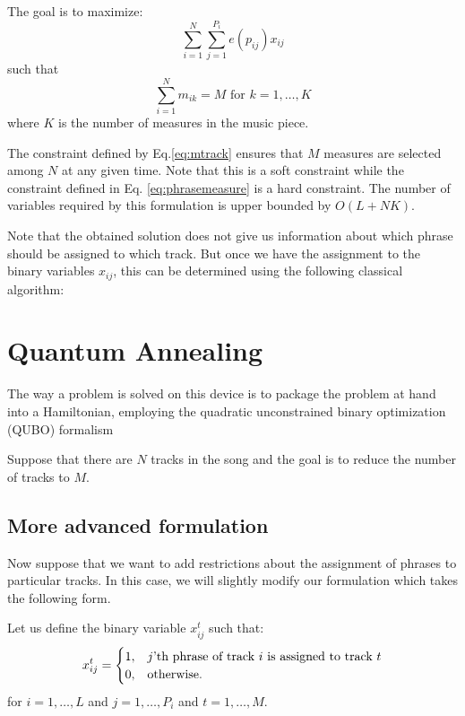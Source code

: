 \documentclass[11pt,a4paper]{article}
\begin{document}
The goal is to maximize:
\begin{equation}
\sum_{i=1}^N\sum_{j=1}^{P_i} e(p_{ij})x_{ij}
\end{equation}
such that
\begin{equation}\label{eq:mtrack}
\sum_{i=1}^N m_{ik} = M \mbox{ for }k=1,\dots, K 
\end{equation}
where $K$ is the number of measures in the music piece. 

The constraint defined by Eq.\eqref{eq:mtrack} ensures that $M$ measures are selected among $ N $ at any given time. Note that this is a soft constraint while the constraint defined in Eq. \ref{eq:phrasemeasure} is a hard constraint. The number of variables required by this formulation is upper bounded by $ O(L+NK) $.

Note that the obtained solution does not give us information about which phrase should be assigned to which track. But once we have the assignment to the binary variables $ x_{ij} $, this can be determined using the following classical algorithm:

\section{Quantum Annealing}
The way a problem is solved on this device is to package the problem at hand into a Hamiltonian, employing the quadratic unconstrained binary optimization (QUBO) formalism

Suppose that there are $ N $ tracks in the song and the goal is to reduce the number of tracks to $ M $.

 
 \subsection{More advanced formulation}
 
 Now suppose that we want to add restrictions about the assignment of phrases to particular tracks. In this case, we will slightly modify our formulation which takes the following form.
 
  Let us define the binary variable $x_{ij}^t$ such that:
 \begin{equation}
 x_{ij}^t =   \begin{cases}%
 1,      & \text{$j$'th phrase of track $i$ is assigned to track $ t $}\\
 0, & \text{otherwise.}
 \end{cases}
 \end{equation}
 for $ i = 1, \dots ,L $ and $ j=1, \dots ,P_i  $ and $ t = 1, \dots, M $.
 
\end{document}
